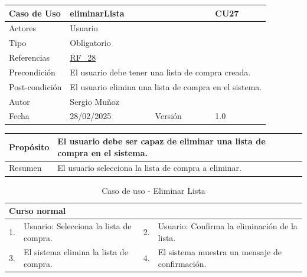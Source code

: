 \newpage

\begin{table}[H]
    \centering
    \begin{tabular}{| m{} | m{} | m{} | m{} |}
        \hline
        \rowcolor[HTML]{C0C0C0} Caso de Uso & \multicolumn{2}{|m{0.43\textwidth}|}{eliminarLista} &  CU27\\ 
        \hline
        Actores & \multicolumn{3}{l|}{Usuario} \\ 
        \hline
        Tipo & \multicolumn{3}{l|}{Obligatorio} \\ 
        \hline
        Referencias & \multicolumn{3}{l|}{\hyperref[req:RF28]{RF\_28}} \\ 
        \hline
        Precondición & \multicolumn{3}{m{0.67\textwidth}|}{El usuario debe tener una lista de compra creada.} \\ 
        \hline
        Post-condición & \multicolumn{3}{m{0.67\textwidth}|}{El usuario elimina una lista de compra en el sistema.} \\ 
        \hline
        Autor & \multicolumn{3}{l|}{Sergio Muñoz} \\ 
        \hline
        Fecha & 28/02/2025 & Versión & 1.0 \\ 
        \hline
    \end{tabular}
\end{table}

\begin{table}[H]
    \centering
    \begin{tabular}{| m{} | m{} | m{} | m{} |}
        \hline
        Propósito & \multicolumn{3}{m{0.67\textwidth}|}{El usuario debe ser capaz de eliminar una lista de compra en el sistema.} \\ 
        \hline
        Resumen & \multicolumn{3}{m{0.67\textwidth}|}{El usuario selecciona la lista de compra a eliminar.} \\ 
        \hline
    \end{tabular}
\end{table}

\begin{table}[H]
    \centering
    \begin{tabular}{| m{} | m{} | m{} | m{} |}
        \hline
        \multicolumn{4}{|m{0.9\textwidth}|}{Curso normal} \\ 
        \hline
        1. & Usuario: Selecciona la lista de compra. 
        & 2. & Usuario: Confirma la eliminación de la lista. \\ 
        \hline
        3. & El sistema elimina la lista de compra. 
        & 4. & El sistema muestra un mensaje de confirmación. \\ 
        \hline
    \end{tabular}
    \caption{Caso de uso - Eliminar Lista}
\end{table}

